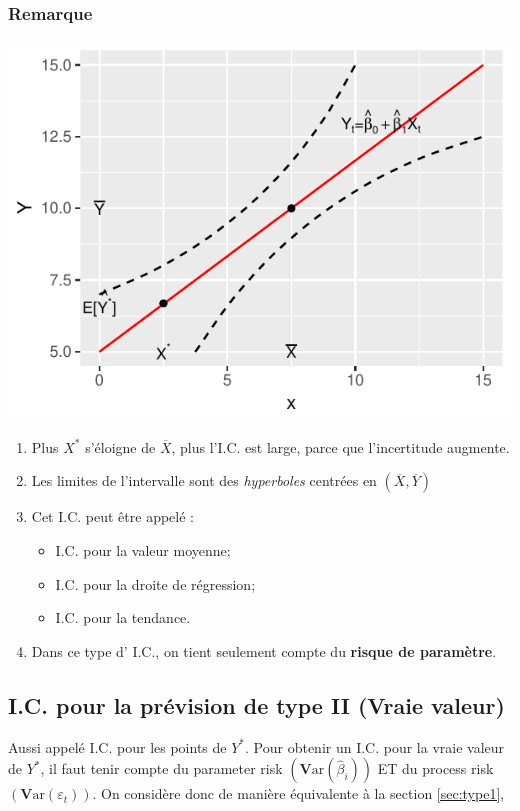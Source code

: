 \documentclass[11pt,french]{report}
\newcommand{\Var}{\mathrm{\textbf{V}ar}}
\begin{document}
\subsubsection*{Remarque}

\includegraphics{notes_de_cours-020}

\begin{enumerate}
\item Plus $X^*$ s'éloigne de $\overline{X}$, plus l'I.C. est large, parce que l'incertitude augmente.
\item Les limites de l'intervalle sont des \emph{hyperboles} centrées en $(\overline{X}, \overline{Y})$
\item Cet I.C. peut être appelé :
     \begin{itemize}
     \item I.C. pour la valeur moyenne;
     \item I.C. pour la droite de régression;
     \item I.C. pour la tendance.
     \end{itemize}
\item Dans ce type d' I.C., on tient seulement compte du \textbf{risque de paramètre}.
\end{enumerate}

\subsection{I.C. pour la prévision de type II (Vraie valeur)}
\label{sec:type2}
Aussi appelé I.C. pour les points de $Y^*$.
\bigskip
Pour obtenir un I.C. pour la vraie valeur de $Y^*$, il faut tenir compte du parameter risk $(\Var(\hat{\beta}_i))$ ET du process risk $(\Var(\varepsilon_t))$. On considère donc de manière équivalente à la section \ref{sec:type1},
\end{document}
